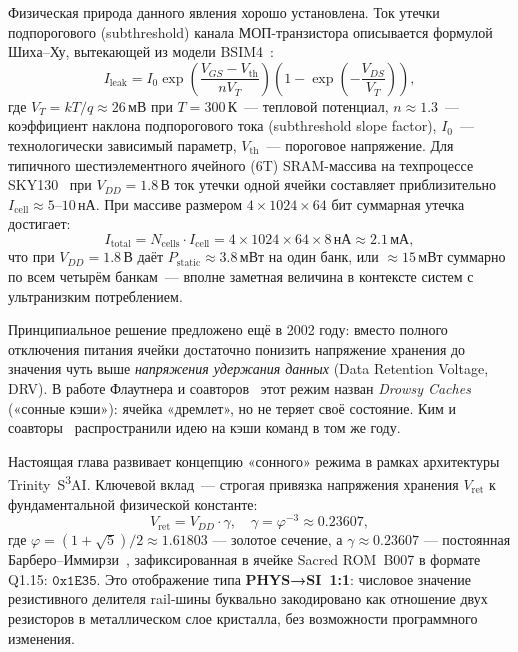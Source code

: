 Физическая природа данного явления хорошо установлена.
Ток утечки подпорогового (subthreshold) канала МОП-транзистора
описывается формулой Шиха--Ху, вытекающей из модели BSIM4~\cite{BSIM4-Manual}:
%
\begin{equation}
  I_\mathrm{leak} = I_0 \exp\!\left(\frac{V_{GS} - V_\mathrm{th}}{n V_T}\right)
    \left(1 - \exp\!\left(-\frac{V_{DS}}{V_T}\right)\right),
  \label{eq:subthreshold}
\end{equation}
%
где $V_T = kT/q \approx 26\,\text{мВ}$ при $T = 300\,\text{К}$~---
тепловой потенциал, $n \approx 1.3$~---
коэффициент наклона подпорогового тока (subthreshold slope factor),
$I_0$~--- технологически зависимый параметр,
$V_\mathrm{th}$~--- пороговое напряжение.
Для типичного шестиэлементного ячейного (6T) SRAM-массива
на техпроцессе SKY130~\cite{SKY130-PDK}
при $V_{DD} = 1.8\,\text{В}$ ток утечки одной ячейки
составляет приблизительно $I_\mathrm{cell} \approx 5$--$10\,\text{нА}$.
При массиве размером $4 \times 1024 \times 64$ бит
суммарная утечка достигает:
%
\begin{equation}
  I_\mathrm{total} = N_\mathrm{cells} \cdot I_\mathrm{cell}
    = 4 \times 1024 \times 64 \times 8\,\text{нА}
    \approx 2.1\,\text{мА},
  \label{eq:total-leak}
\end{equation}
%
что при $V_{DD} = 1.8\,\text{В}$ даёт $P_\mathrm{static} \approx 3.8\,\text{мВт}$
на один банк, или $\approx 15\,\text{мВт}$ суммарно по всем четырём банкам~---
вполне заметная величина в контексте систем с ультранизким потреблением.

Принципиальное решение предложено ещё в 2002 году:
вместо полного отключения питания ячейки достаточно понизить
напряжение хранения до значения чуть выше \emph{напряжения удержания данных}
(Data Retention Voltage, DRV).
В работе Флаутнера и соавторов~\cite{FlautnerISCA2002}
этот режим назван \emph{Drowsy Caches} («сонные кэши»):
ячейка «дремлет», но не теряет своё состояние.
Ким и соавторы~\cite{KimDAC2002} распространили идею
на кэши команд в том же году.

Настоящая глава развивает концепцию «сонного» режима в рамках
архитектуры Trinity~S\textsuperscript{3}AI.
Ключевой вклад~--- строгая привязка напряжения хранения $V_\mathrm{ret}$
к фундаментальной физической константе:
%
\begin{equation}
  V_\mathrm{ret} = V_{DD} \cdot \gamma, \quad
  \gamma = \varphi^{-3} \approx 0.23607,
  \label{eq:vret-def}
\end{equation}
%
где $\varphi = (1+\sqrt{5})/2 \approx 1.61803$ — золотое сечение,
а $\gamma \approx 0.23607$ — постоянная Барберо--Иммирзи~\cite{BarberoImmirzi1995},
зафиксированная в ячейке Sacred ROM~B007 в формате Q1.15:
$\mathtt{0x1E35}$.
Это отображение типа \textbf{PHYS→SI~1:1}: числовое значение
резистивного делителя rail-шины буквально закодировано
как отношение двух резисторов в металлическом слое кристалла,
без возможности программного изменения.

